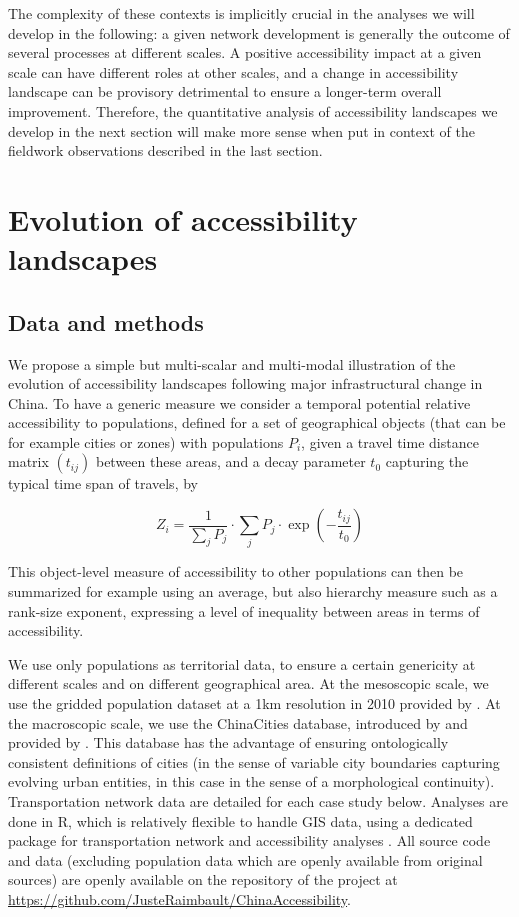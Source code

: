 The complexity of these contexts is implicitly crucial in the analyses we will develop in the following: a given network development is generally the outcome of several processes at different scales. A positive accessibility impact at a given scale can have different roles at other scales, and a change in accessibility landscape can be provisory detrimental to ensure a longer-term overall improvement. Therefore, the quantitative analysis of accessibility landscapes we develop in the next section will make more sense when put in context of the fieldwork observations described in the last section.



\section{Evolution of accessibility landscapes}


\subsection{Data and methods}

We propose a simple but multi-scalar and multi-modal illustration of the evolution of accessibility landscapes following major infrastructural change in China. To have a generic measure we consider a temporal potential relative accessibility to populations, defined for a set of geographical objects (that can be for example cities or zones) with populations $P_i$, given a travel time distance matrix $(t_{ij})$ between these areas, and a decay parameter $t_0$ capturing the typical time span of travels, by

\[
Z_i = \frac{1}{\sum_j P_j} \cdot \sum_j P_j \cdot \exp{\left(- \frac{t_{ij}}{t_0}\right)}
\]

This object-level measure of accessibility to other populations can then be summarized for example using an average, but also hierarchy measure such as a rank-size exponent, expressing a level of inequality between areas in terms of accessibility.

We use only populations as territorial data, to ensure a certain genericity at different scales and on different geographical area. At the mesoscopic scale, we use the gridded population dataset at a 1km resolution in 2010 provided by \cite{fu2014grid}. At the macroscopic scale, we use the ChinaCities database, introduced by \cite{swerts2013systemes} and provided by \cite{swerts2017database}. This database has the advantage of ensuring ontologically consistent definitions of cities (in the sense of variable city boundaries capturing evolving urban entities, in this case in the sense of a morphological continuity). Transportation network data are detailed for each case study below. Analyses are done in R, which is relatively flexible to handle GIS data, using a dedicated package for transportation network and accessibility analyses \citep{raimbault2018trpackage}. All source code and data (excluding population data which are openly available from original sources) are openly available on the repository of the project at \url{https://github.com/JusteRaimbault/ChinaAccessibility}.





